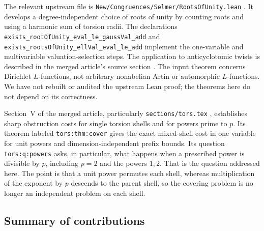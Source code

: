 \documentclass[11pt]{article}
\theoremstyle{definition}
\begin{document}
The relevant upstream file is \texttt{New/Congruences/Selmer/RootsOfUnity.lean} \cite{roots}. It develops a degree-independent choice of roots of unity by counting roots and using a harmonic sum of torsion radii. The declarations \nolinkurl{exists_rootOfUnity_eval_le_gaussVal_add} and \nolinkurl{exists_rootsOfUnity_ellVal_eval_le_add} implement the one-variable and multivariable valuation-selection steps. The application to anticyclotomic twists is described in the merged article's source section \cite{source}. The input theorem concerns Dirichlet $L$-functions, not arbitrary nonabelian Artin or automorphic $L$-functions. We have not rebuilt or audited the upstream Lean proof; the theorems here do not depend on its correctness.

Section~V of the merged article, particularly \texttt{sections/tors.tex} \cite{tors}, establishes sharp obstruction costs for single torsion shells and for powers prime to $p$. Its theorem labeled \texttt{tors:thm:cover} gives the exact mixed-shell cost in one variable for unit powers and dimension-independent prefix bounds. Its question \texttt{tors:q:powers} asks, in particular, what happens when a prescribed power is divisible by $p$, including $p=2$ and the powers $1,2$. That is the question addressed here. The point is that a unit power permutes each shell, whereas multiplication of the exponent by $p$ descends to the parent shell, so the covering problem is no longer an independent problem on each shell.

\subsection{Summary of contributions}
\end{document}
